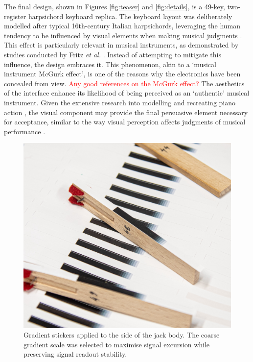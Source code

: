 The final design, shown in Figures \ref{fig:teaser} and \ref{fig:details}, is a 49-key, two-register harpsichord keyboard replica. The keyboard layout was deliberately modelled after typical 16th-century Italian harpsichords, leveraging the human tendency to be influenced by visual elements when making musical judgments \cite{Tsay2013}. This effect is particularly relevant in musical instruments, as demonstrated by studies conducted by Fritz \emph{et al.} \cite{Fritz2012, Fritz2014, Fritz2017}. Instead of attempting to mitigate this influence, the design embraces it. This phenomenon, akin to a `musical instrument McGurk effect’, is one of the reasons why the electronics have been concealed from view. \textcolor{red}{Any good references on the McGurk effect?} The aesthetics of the interface enhance its likelihood of being perceived as an `authentic' musical instrument. Given the extensive research into modelling and recreating piano action \cite{Cadoz1990, Gillespie1996, Timmermans2020}, the visual component may provide the final persuasive element necessary for acceptance, similar to the way visual perception affects judgments of musical performance \cite{Tsay2013}.

\begin{figure}[!b]  
  \centering
  \includegraphics[width=0.9\linewidth,trim={0 0 0 0.5cm},clip]{src/images/tagging-jacks-3.jpg} 
  \caption{Gradient stickers applied to the side of the jack body. The coarse gradient scale was selected to maximise signal excursion while preserving signal readout stability.}
  \Description{} 
  \label{fig:jack-tags}
\end{figure}

